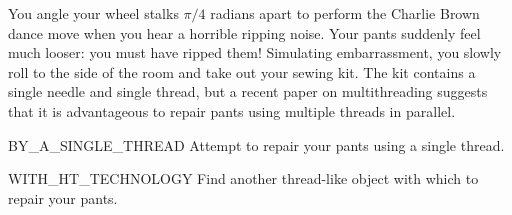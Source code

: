 You angle your wheel stalks $\pi/4$ radians apart
to perform the Charlie Brown dance move
when you hear a horrible ripping noise.
Your pants suddenly feel much looser:
you must have ripped them!
Simulating embarrassment,
you slowly roll to the side of the room and take out your sewing kit.
The kit contains a single needle and single thread,
but a recent paper on multithreading \citep{sol}
suggests that it is advantageous to repair pants
using multiple threads in parallel.

\begin{switch}
\item{BY\_A\_SINGLE\_THREAD}
  Attempt to repair your pants using a single thread.
\item{WITH\_HT\_TECHNOLOGY}
  Find another thread-like object with which to repair your pants.
\end{switch}


